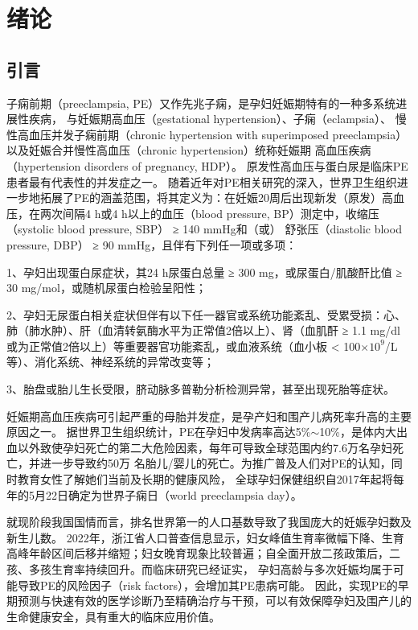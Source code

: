 \chapter{绪论}

\section{引言}
子痫前期（preeclampsia, PE）又作先兆子痫，是孕妇妊娠期特有的一种多系统进展性疾病， 与妊娠期高血压（gestational hypertension）、子痫（eclampsia）、
慢性高血压并发子痫前期（chronic hypertension with superimposed preeclampsia）以及妊娠合并慢性高血压（chronic hypertension）统称妊娠期
高血压疾病（hypertension disorders of pregnancy, HDP）\cite{OAG9,HDASOM,2000s1}。
原发性高血压与蛋白尿是临床PE患者最有代表性的并发症之一。
随着近年对PE相关研究的深入，世界卫生组织进一步地拓展了PE的涵盖范围，将其定义为：在妊娠20周后出现新发（原发）高血压，在两次间隔4 h或4 h以上的血压（blood pressure, BP）测定中，收缩压（systolic blood pressure, SBP） ≥ 140 mmHg和（或）
舒张压（diastolic blood pressure, DBP） ≥ 90 mmHg，且伴有下列任一项或多项\cite{OAG9,FIGO}：

1、孕妇出现蛋白尿症状，其24 h尿蛋白总量 ≥ 300 mg，或尿蛋白/肌酸酐比值 ≥ 30 mg/mol，或随机尿蛋白检验呈阳性；

2、孕妇无尿蛋白相关症状但伴有以下任一器官或系统功能紊乱、受累受损：心、肺（肺水肿）、肝（血清转氨酶水平为正常值2倍以上）、肾（血肌酐 ≥ 1.1 mg/dl
或为正常值2倍以上）等重要器官功能紊乱，或血液系统（血小板 < 100$\times 10^{9}$/L等）、消化系统、神经系统的异常改变等；

3、胎盘或胎儿生长受限，脐动脉多普勒分析检测异常，甚至出现死胎等症状。

妊娠期高血压疾病可引起严重的母胎并发症，是孕产妇和围产儿病死率升高的主要原因之一\cite{OAG9}。
据世界卫生组织统计，PE在孕妇中发病率高达5\%$ \sim $10\%，是体内大出血以外致使孕妇死亡的第二大危险因素，每年可导致全球范围内约7.6万名孕妇死亡，并进一步导致约50万
名胎儿/婴儿的死亡\cite{DAM2015,LCT2006}。为推广普及人们对PE的认知，同时教育女性了解她们当前及长期的健康风险，
全球孕妇保健组织自2017年起将每年的5月22日确定为世界子痫日（world preeclampsia day）。

就现阶段我国国情而言，排名世界第一的人口基数导致了我国庞大的妊娠孕妇数及新生儿数\cite{nbs2022}。
2022年，浙江省人口普查信息显示，妇女峰值生育率微幅下降、生育高峰年龄区间后移并缩短；妇女晚育现象比较普遍；自全面开放二孩政策后，二孩、多孩生育率持续回升\cite{zjtjj2022}。而临床研究已经证实，
孕妇高龄与多次妊娠均属于可能导致PE的风险因子（risk factors），会增加其PE患病可能\cite{Duckitt2005,FIGO,Yogev2010,Poon2010,Lee2000,Coonrod1995,Robillard1993}。
因此，实现PE的早期预测与快速有效的医学诊断乃至精确治疗与干预，可以有效保障孕妇及围产儿的生命健康安全，具有重大的临床应用价值。

